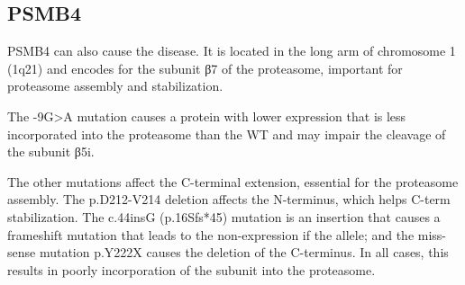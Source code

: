 \documentclass[a4paper,10pt]{report}
\begin{document}
\subsection{PSMB4}

PSMB4 can also cause the disease. It is located in the long arm of chromosome 1 (1q21) and encodes for the subunit β7 of the proteasome, important for proteasome assembly and stabilization.\par
The -9G>A mutation causes a protein with lower expression that is less incorporated into the proteasome than the WT and may impair the cleavage of the subunit β5i.\par
The other mutations affect the C-terminal extension, essential for the proteasome assembly. The p.D212-V214 deletion affects the N-terminus, which helps C-term stabilization. The c.44insG (p.16Sfs*45) mutation is an insertion that causes a frameshift mutation that leads to the non-expression if the allele; and the miss-sense mutation p.Y222X causes the deletion of the C-terminus. In all cases, this results in poorly incorporation of the subunit into the proteasome.
\end{document}
